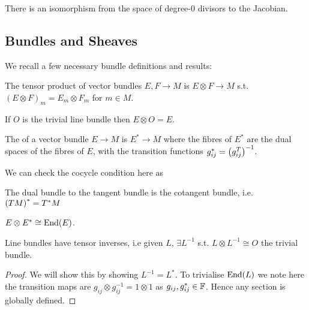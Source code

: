 \documentclass{article}
\begin{document}
\begin{corollary}
	There is an isomorphism from the space of degree-0 divisors to the Jacobian. 
\end{corollary}

\subsection{Bundles and Sheaves}
We recall a few necessary bundle definitions and results:
\begin{definition}
	The tensor product of vector bundles $E,F \to M$ is $E\otimes F \to M$ s.t. $(E \otimes F)_m = E_m \otimes F_m$ for $m \in M$. 
\end{definition}

\begin{lemma}
	If $O$ is the trivial line bundle then $E\otimes O = E$. 
\end{lemma}

\begin{definition}
	The  of a vector bundle $E \to M$ is $E^\ast \to M$ where the fibres of $E^\ast$ are the dual spaces of the fibres of $E$, with the transition functions $g_{ij}^\ast = \left( g_{ij}^T \right)^{-1}$.
\end{definition}

\begin{remark}
	We can check the cocycle condition here as 
\end{remark}

\begin{example}
	The dual bundle to the tangent bundle is the cotangent bundle, i.e. $\left( TM \right)^\ast = T^\ast M$
\end{example}

\begin{lemma}
	$E \otimes E^\ast \cong \operatorname{End}(E)$. 
\end{lemma}

\begin{lemma}
	Line bundles have tensor inverses, i.e given $L$, $\exists L^{-1}$ s.t. $L \otimes L^{-1} \cong O$ the trivial bundle. 
\end{lemma}
\begin{proof}
	We will show this by showing $L^{-1} = L^\ast$. To trivialise $\operatorname{End}(L)$ we note here the transition maps are $g_{ij} \otimes g_{ij}^{-1} =  1 \otimes 1$ as $g_{ij}, g_{ij}^\ast \in \mathbb{F}$. Hence any section is globally defined. 
\end{proof}
\end{document}
